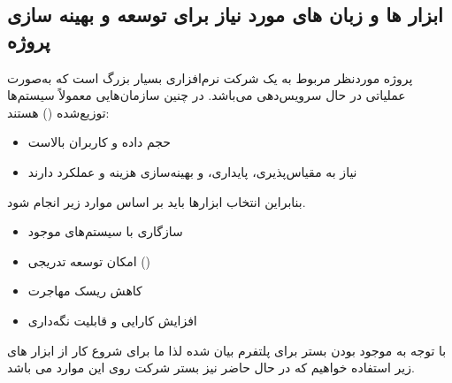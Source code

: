 \documentclass[12pt,a4paper]{report}
\begin{document}
\subsection{ابزار ها و زبان های مورد نیاز برای توسعه و بهینه سازی پروژه}

پروژه موردنظر مربوط به یک شرکت نرم‌افزاری بسیار بزرگ است که به‌صورت عملیاتی در حال سرویس‌دهی می‌باشد. در چنین سازمان‌هایی معمولاً سیستم‌ها توزیع‌شده () هستند:
\begin{itemize}
	\item حجم داده و کاربران بالاست
	\item نیاز به مقیاس‌پذیری، پایداری، و بهینه‌سازی هزینه و عملکرد دارند
	\end{itemize}
بنابراین انتخاب ابزارها باید بر اساس موارد زیر انجام شود.
\begin{itemize}
	\item سازگاری با سیستم‌های موجود
	\item
امکان توسعه تدریجی ()
	\item 
	کاهش ریسک مهاجرت
	\item 
	افزایش کارایی و قابلیت نگه‌داری
\end{itemize}
با توجه به موجود بودن بستر برای پلتفرم بیان شده لذا ما برای شروع کار از ابزار های زیر استفاده خواهیم که در حال حاضر نیز بستر شرکت روی این موارد می باشد.
\end{document}

